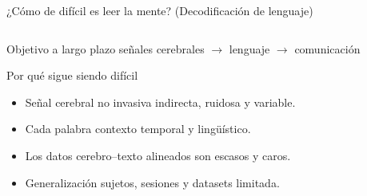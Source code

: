 \documentclass[aspectratio=169,10pt]{beamer}
\newcommand{\bigmetric}[2]{{\huge\bfseries\color{deepgreen}{#1}\par}\vspace{0.8mm}{\scriptsize #2\par}\vspace{3mm}}
\begin{document}
\begin{frame}[c]{¿Cómo de difícil es leer la mente? (Decodificación de lenguaje)}
  \begin{columns}[c,totalwidth=\linewidth]
    \begin{column}{0.58\linewidth}
      \begin{block}{Objetivo a largo plazo}
        \centering
        \Large señales cerebrales $\rightarrow$ lenguaje $\rightarrow$ comunicación
      \end{block}

      \vspace{2mm}

      \begin{block}{Por qué sigue siendo difícil}
        \begin{itemize}
          \item Señal cerebral no invasiva indirecta, ruidosa y variable.
          \item Cada palabra contexto temporal y lingüístico.
          \item Los datos cerebro--texto alineados son escasos y caros.
          \item Generalización sujetos, sesiones y datasets limitada.
        \end{itemize}
      \end{block}
    \end{column}

    \begin{column}{0.38\linewidth}
      \centering
      \bigmetric{BCI}{interfaz cerebro--ordenador}
      \bigmetric{B2T}{brain-to-text}
      \bigmetric{reto}{pasar de señales ruidosas a palabras}
    \end{column}
  \end{columns}

\end{frame}

\end{document}

